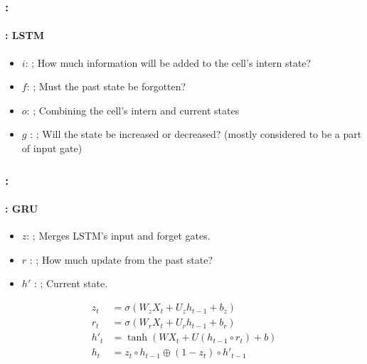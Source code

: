 \documentclass[xcolor=table]{beamer}
\begin{document}
\begin{frame}
	\frametitle{\insertshortsubtitle: \insertsection}
	\framesubtitle{\insertsubsection: LSTM}
	
	\begin{minipage}{0.50\textwidth} 
		\begin{itemize}
			\item $i$: ;
			How much information will be added to the cell's intern state?
			\item $f$: ;
			Must the past state be forgotten?
			\item $o$:  ;
			Combining the cell's intern and current states	
		\end{itemize}
	\end{minipage}
	\begin{minipage}{0.49\textwidth}
	\end{minipage}
	
	\begin{itemize}
		\item $g$ : ;
		Will the state be  increased or decreased?
		(mostly considered to be a part of input gate)

	\end{itemize}
	
\end{frame}

\begin{frame}
	\frametitle{\insertshortsubtitle: \insertsection}
	\framesubtitle{\insertsubsection: GRU}
	
	\begin{minipage}{0.50\textwidth} 
		\begin{itemize}
			\item $z$: ;
			Merges LSTM's input and forget gates. 
			\item $r$ : ; 
			How much update from the past state?
			\item $h'$ : ;
			Current state.	
		\end{itemize}
		{\small
			\begin{align*}
				z_t &= \sigma(W_z X_t + U_z h_{t-1} + b_z) \\
				r_t &= \sigma(W_r X_t + U_r h_{t-1} + b_r) \\
				h'_t &= \tanh(W X_t + U (h_{t-1} \circ r_t) + b) \\
				h_t &= z_t \circ h_{t-1} \oplus (1-z_t) \circ h'_{t-1}
			\end{align*}
		}
	\end{minipage}
	\begin{minipage}{0.49\textwidth}
	\end{minipage}
	
\end{frame}
\end{document}
